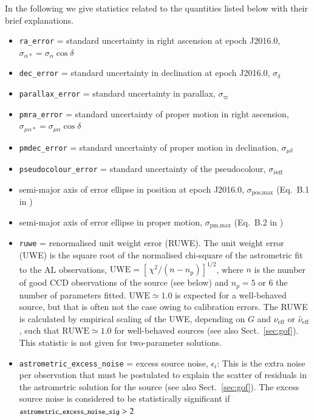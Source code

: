 \documentclass[longauth]{aa} %
\newcommand{\gacs}[1]{{\footnotesize\texttt{#1}}}
\begin{document}
In the following we give statistics related to the quantities 
listed below with their brief explanations.
\begin{itemize}
\item \gacs{ra\_error} = standard uncertainty in right ascension at epoch J2016.0, 
$\sigma_{\alpha*}=\sigma_\alpha\cos\delta$
\item  \gacs{dec\_error} = standard uncertainty in declination at epoch J2016.0, 
$\sigma_{\delta}$
\item  \gacs{parallax\_error} = standard uncertainty in parallax, 
$\sigma_{\varpi}$
\item \gacs{pmra\_error} = standard uncertainty of proper motion in right ascension, 
$\sigma_{\mu\alpha*}=\sigma_{\mu\alpha}\cos\delta$
\item \gacs{pmdec\_error} = standard uncertainty of proper motion in declination, 
$\sigma_{\mu\delta}$
\item \gacs{pseudocolour\_error} = standard uncertainty of the pseudocolour,
$\sigma_{\hat{\nu}\text{eff}}$ 
\item semi-major axis of error ellipse in position at epoch J2016.0, $\sigma_\text{pos,max}$
(Eq.~B.1 in )
\item semi-major axis of error ellipse in proper motion, $\sigma_\text{pm,max}$
(Eq.~B.2 in )
\item \gacs{ruwe} = renormalised unit weight error (RUWE). The unit weight error (UWE)
is the square root of the normalised chi-square of the astrometric fit to the AL observations, 
$\text{UWE}=[\,\chi^2/(n-n_\text{p})]^{1/2}$, where $n$ is the number of 
good CCD observations of the source (see below) and $n_p=5$ or 6 the number of
parameters fitted. $\text{UWE}\simeq 1.0$ is expected for a well-behaved source, but
that is often not the case owing to calibration errors. The RUWE is calculated by
empirical scaling of the UWE, depending on $G$ and $\nu_\text{eff}$ or 
$\hat{\nu}_\text{eff}$, such that $\text{RUWE}\simeq 1.0$ for well-behaved sources
(see also Sect.~\ref{sec:gof}). This statistic is not given for two-parameter solutions.
\item \gacs{astrometric\_excess\_noise} = excess source noise, $\epsilon_i$: This
is the extra noise per observation that must be postulated to explain the scatter
of residuals in the astrometric solution for the source (see also Sect.~\ref{sec:gof}). 
The excess source noise is considered to be statistically significant if 
$\gacs{astrometric\_excess\_noise\_sig}>2$

\end{itemize}
\end{document}
